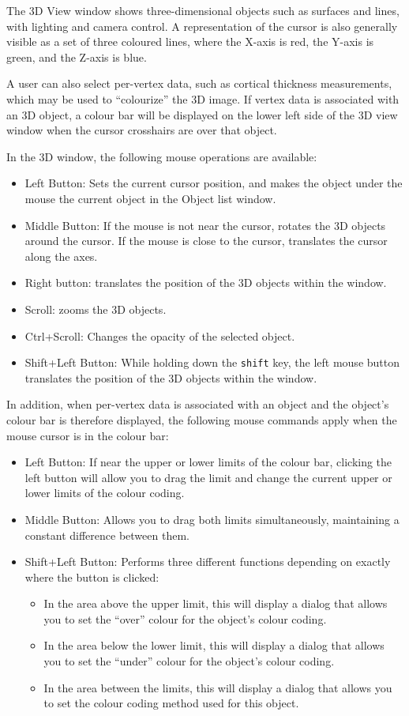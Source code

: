 \documentclass[11pt,letterpaper]{article}
\newcommand{\ident}[1]{{\tt #1}}
\begin{document}
The 3D View window shows three-dimensional objects such as surfaces and
lines, with lighting and camera control. A representation of the cursor is 
also generally visible as a set of three coloured lines, where the X-axis is red, the Y-axis is green, and the Z-axis is blue.

A user can also select per-vertex data, such as cortical thickness
measurements, which may be used to ``colourize'' the 3D image. If vertex
data is associated with an 3D object, a colour bar will be displayed on
the lower left side of the 3D view window when the cursor crosshairs are
over that object.

In the 3D window, the following mouse operations are available:

\begin{itemize}
\item Left Button: Sets the current cursor position, and makes the 
object under the mouse the current object in the Object list window.
\item Middle Button: If the mouse is not near the cursor, rotates the 3D
objects around the cursor. If the mouse is close to the cursor, translates
the cursor along the axes.
\item Right button: translates the position of the 3D objects within the
window.
\item Scroll: zooms the 3D objects.
\item Ctrl+Scroll: Changes the opacity of the selected object.
\item Shift+Left Button: While holding down the \ident{shift} key, the
 left mouse button translates the position of the 3D objects within
 the window.
\end{itemize}

In addition, when per-vertex data is associated with an object and the
object's colour bar is therefore displayed, the following mouse commands
apply when the mouse cursor is in the colour bar:
\begin{itemize}
\item Left Button: If near the upper or lower limits of the colour bar,
clicking the left button will allow you to drag the limit and change the
current upper or lower limits of the colour coding.
\item Middle Button: Allows you to drag both limits simultaneously, maintaining a 
constant difference between them.
\item Shift+Left Button: Performs three different functions depending on
exactly where the button is clicked:
\begin{itemize}
\item In the area above the upper limit,
 this will display a dialog that allows you to set the ``over'' colour
 for the object's colour coding.
\item In the area below the lower limit,
 this will display a dialog that allows you to set the ``under'' colour
 for the object's colour coding.
\item In the area between the limits, this will display a dialog that
allows you to set the colour coding method used for this object.
\end{itemize}
\end{itemize}
\end{document}
